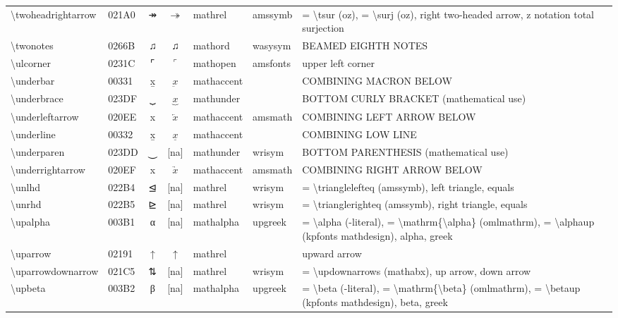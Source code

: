 \documentclass[a4paper,landscape]{article}
\begin{document}
\begin{longtable}{llcclll}
\textbackslash{}twoheadrightarrow & 021A0 & ↠ & $\twoheadrightarrow$ & mathrel & amssymb & = \textbackslash{}tsur (oz), = \textbackslash{}surj (oz), right two-headed arrow, z notation total surjection \\
\textbackslash{}twonotes & 0266B & ♫ & $\twonotes$ & mathord & wasysym & BEAMED EIGHTH NOTES \\
\textbackslash{}ulcorner & 0231C & ⌜ & $\ulcorner$ & mathopen & amsfonts & upper left corner \\
\textbackslash{}underbar & 00331 & x̱ & $\underbar{x}$ & mathaccent &  & COMBINING MACRON BELOW \\
\textbackslash{}underbrace & 023DF & ⏟ & $\underbrace{x}$ & mathunder &  & BOTTOM CURLY BRACKET (mathematical use) \\
\textbackslash{}underleftarrow & 020EE & x⃮ & $\underleftarrow{x}$ & mathaccent & amsmath & COMBINING LEFT ARROW BELOW \\
\textbackslash{}underline & 00332 & x̲ & $\underline{x}$ & mathaccent &  & COMBINING LOW LINE \\
\textbackslash{}underparen & 023DD & ⏝ & [na] & mathunder & wrisym & BOTTOM PARENTHESIS (mathematical use) \\
\textbackslash{}underrightarrow & 020EF & x⃯ & $\underrightarrow{x}$ & mathaccent & amsmath & COMBINING RIGHT ARROW BELOW \\
\textbackslash{}unlhd & 022B4 & ⊴ & [na] & mathrel & wrisym & = \textbackslash{}trianglelefteq (amssymb),  left triangle,  equals \\
\textbackslash{}unrhd & 022B5 & ⊵ & [na] & mathrel & wrisym & = \textbackslash{}trianglerighteq (amssymb),  right triangle,  equals \\
\textbackslash{}upalpha & 003B1 & α & [na] & mathalpha & upgreek & = \textbackslash{}alpha (-literal), = \textbackslash{}mathrm\{\textbackslash{}alpha\} (omlmathrm),  = \textbackslash{}alphaup (kpfonts mathdesign),  alpha,  greek \\
\textbackslash{}uparrow & 02191 & ↑ & $\uparrow$ & mathrel &  & upward arrow \\
\textbackslash{}uparrowdownarrow & 021C5 & ⇅ & [na] & mathrel & wrisym & = \textbackslash{}updownarrows (mathabx),  up arrow,  down arrow \\
\textbackslash{}upbeta & 003B2 & β & [na] & mathalpha & upgreek & = \textbackslash{}beta (-literal), = \textbackslash{}mathrm\{\textbackslash{}beta\} (omlmathrm),  = \textbackslash{}betaup (kpfonts mathdesign),  beta,  greek \\

\end{longtable}
\end{document}
